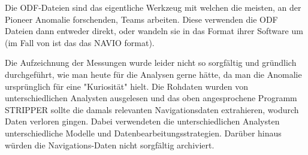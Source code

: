 Die ODF-Dateien sind das eigentliche Werkzeug mit welchen die meisten, an der Pioneer Anomalie forschenden, Teams arbeiten. Diese verwenden die ODF Dateien dann entweder direkt, oder wandeln sie in das Format ihrer Software um (im Fall von \cite{Anderson2002} ist das das NAVIO format).

Die Aufzeichnung der Messungen wurde leider nicht so sorgfältig und gründ\-lich durchgeführt, wie man heute für die Analysen gerne hätte, da man die Anomalie ursprünglich für eine "Kuriosität" hielt.\cite{Nieto2005}
Die Rohdaten wurden von unterschiedlichen Analysten ausgelesen und das oben angesprochene Programm STRIPPER sollte die damals relevanten Navigationsdaten extrahieren\cite{Nieto2005}, wodurch Daten verloren gingen. %
Dabei verwendeten die unterschiedlichen Analysten unterschiedliche Modelle und Datenbearbeitungsstrategien.\cite{Nieto2005}
Darüber hinaus würden die Navigations-Daten nicht sorgfältig archiviert.\cite{Nieto2005}




